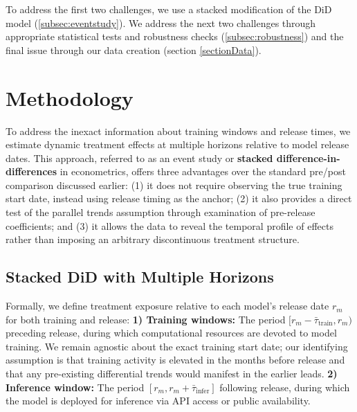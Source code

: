 \documentclass[sigconf]{acmart}
\begin{document}
To address the first two challenges, we use a stacked modification of the DiD model (\autoref{subsec:eventstudy}). We address the next two challenges through appropriate statistical tests and robustness checks (\autoref{subsec:robustness}) and the final issue through our data creation (section \ref{sectionData}). 


\section{Methodology} 

To address the inexact information about training windows and release times, we estimate dynamic treatment effects at multiple horizons relative to model release dates. This approach, referred to as an event study or \textbf{stacked difference-in-differences} in econometrics, offers three advantages over the standard pre/post comparison discussed earlier: (1) it does not require observing the true training start date, instead using release timing as the anchor; (2) it also provides a direct test of the parallel trends assumption through examination of pre-release coefficients; and (3) it allows the data to reveal the temporal profile of effects rather than imposing an arbitrary discontinuous treatment structure.

\subsection{Stacked DiD with Multiple Horizons}%
\label{subsec:eventstudy}
Formally, we define treatment exposure relative to each model's release date $r_m$ for both training and release: \textbf{1) Training windows:} The period $[r_m - \bar{\tau}_{\text{train}}, r_m)$ preceding release, during which computational resources are devoted to model training. We remain agnostic about the exact training start date; our identifying assumption is that training activity is elevated in the months before release and that any pre-existing differential trends would manifest in the earlier leads. \textbf{2) Inference window:} The period $[r_m, r_m + \bar{\tau}_{\text{infer}}]$ following release, during which the model is deployed for inference via API access or public availability.
\end{document}
